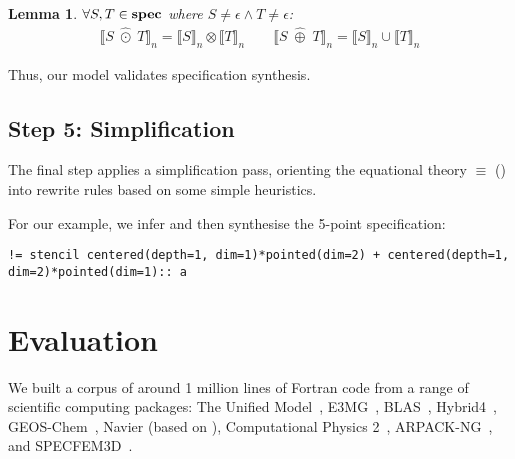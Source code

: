 \documentclass[10pt,preprint,numbers]{sigplanconf}
\newcounter{block}
\newtheorem{lemma}[block]{Lemma}
\theoremstyle{definition}
\newcommand{\interp}[1]{\llbracket{#1}\rrbracket}
\begin{document}
\begin{lemma}%
$\forall S,
  T \in \textbf{spec}$ where $S\!\neq \epsilon \wedge T\!\neq \epsilon$:
\begin{align*}
\interp{S \; \hat{\odot} \; T}_n = \interp{S}_n \otimes \interp{T}_n
  \qquad
\interp{S \; \hat{\oplus} \; T}_n = \interp{S}_n \cup \interp{T}_n
\end{align*}
\label{lem:alg-soundness}
\vspace{-2em}
\end{lemma}
%
\noindent
Thus, our model validates specification synthesis.
%
\subsection{Step 5: Simplification}
The final step applies a simplification pass, orienting the
equational theory $\equiv$ () into rewrite rules
based on some simple heuristics.

For our example, we infer and then synthesise the
5-point specification:
\begin{verbatim}
!= stencil centered(depth=1, dim=1)*pointed(dim=2) + centered(depth=1, dim=2)*pointed(dim=1):: a
\end{verbatim}

\section{Evaluation}
\label{sec:evaluation}




We built a corpus of around 1 million lines of Fortran code from a
range of scientific computing packages: The Unified Model~\cite{um},
E3MG~\cite{RePEc:aen:journl:2006se-a12}, BLAS~\cite{blas},
Hybrid4~\cite{GBC:GBC635}, GEOS-Chem~\cite{geos-chem}, Navier (based
on \cite{griebel1997numerical}), Computational Physics
2~\cite{nicholas2006computational},
ARPACK-NG~\cite{arpackng}, and
SPECFEM3D~\cite{specfem3d}.
\end{document}
